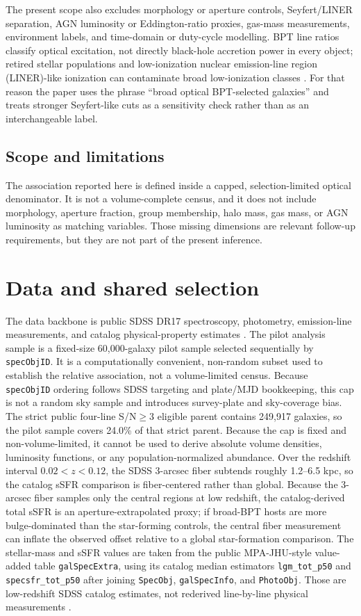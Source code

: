 \documentclass[twocolumn]{aastex631}
\begin{document}
The present scope also excludes morphology or aperture controls, Seyfert/LINER separation, AGN luminosity or Eddington-ratio proxies, gas-mass measurements, environment labels, and time-domain or duty-cycle modelling. BPT line ratios classify optical excitation, not directly black-hole accretion power in every object; retired stellar populations and low-ionization nuclear emission-line region (LINER)-like ionization can contaminate broad low-ionization classes \citep{stasinska2008,stasinska2015}. For that reason the paper uses the phrase ``broad optical BPT-selected galaxies'' and treats stronger Seyfert-like cuts as a sensitivity check rather than as an interchangeable label.

\subsection{Scope and limitations}
The association reported here is defined inside a capped, selection-limited optical denominator. It is not a volume-complete census, and it does not include morphology, aperture fraction, group membership, halo mass, gas mass, or AGN luminosity as matching variables. Those missing dimensions are relevant follow-up requirements, but they are not part of the present inference.

\section{Data and shared selection}
The data backbone is public SDSS DR17 spectroscopy, photometry, emission-line measurements, and catalog physical-property estimates \citep{york2000,sdssdr17,brinchmann2004}. The pilot analysis sample is a fixed-size 60,000-galaxy pilot sample selected sequentially by \texttt{specObjID}. It is a computationally convenient, non-random subset used to establish the relative association, not a volume-limited census. Because \texttt{specObjID} ordering follows SDSS targeting and plate/MJD bookkeeping, this cap is not a random sky sample and introduces survey-plate and sky-coverage bias. The strict public four-line S/N$\geq3$ eligible parent contains 249,917 galaxies, so the pilot sample covers 24.0\% of that strict parent. Because the cap is fixed and non-volume-limited, it cannot be used to derive absolute volume densities, luminosity functions, or any population-normalized abundance.
Over the redshift interval $0.02<z<0.12$, the SDSS 3-arcsec fiber subtends roughly 1.2--6.5 kpc, so the catalog sSFR comparison is fiber-centered rather than global.
Because the 3-arcsec fiber samples only the central regions at low redshift, the catalog-derived total sSFR is an aperture-extrapolated proxy; if broad-BPT hosts are more bulge-dominated than the star-forming controls, the central fiber measurement can inflate the observed offset relative to a global star-formation comparison.
The stellar-mass and sSFR values are taken from the public MPA-JHU-style value-added table \texttt{galSpecExtra}, using its catalog median estimators \texttt{lgm\_tot\_p50} and \texttt{specsfr\_tot\_p50} after joining \texttt{SpecObj}, \texttt{galSpecInfo}, and \texttt{PhotoObj}. Those are low-redshift SDSS catalog estimates, not rederived line-by-line physical measurements \citep{brinchmann2004,sdssdr17,york2000}.
\end{document}
